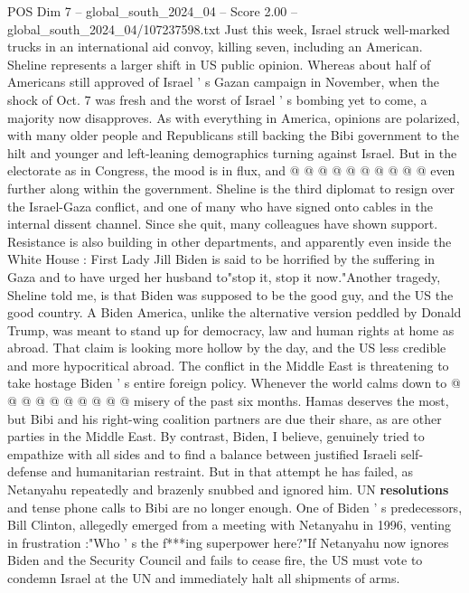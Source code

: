 \begin{textsample}{POS Dim 7 – global\_south\_2024\_04 – Score 2.00 – global\_south\_2024\_04/107237598.txt}
Just this week, Israel struck well-marked trucks in an international aid convoy, killing seven, including an American.
Sheline represents a larger shift in US public opinion.
Whereas about half of Americans still approved of Israel ' s Gazan campaign in November, when the shock of Oct. 7 was fresh and the worst of Israel ' s bombing yet to come, a majority now disapproves.
As with everything in America, opinions are polarized, with many older people and Republicans still backing the Bibi government to the hilt and younger and left-leaning demographics turning against Israel.
But in the electorate as in Congress, the mood is in flux, and @ @ @ @ @ @ @ @ @ @ even further along within the government.
Sheline is the third diplomat to resign over the Israel-Gaza conflict, and one of many who have signed onto cables in the internal dissent channel.
Since she quit, many colleagues have shown support.
Resistance is also building in other departments, and apparently even inside the White House : First Lady Jill Biden is said to be horrified by the suffering in Gaza and to have urged her husband to"stop it, stop it now."Another tragedy, Sheline told me, is that Biden was supposed to be the good guy, and the US the good country.
A Biden America, unlike the alternative version peddled by Donald Trump, was meant to stand up for democracy, law and human rights at home as abroad.
That claim is looking more hollow by the day, and the US less credible and more hypocritical abroad.
The conflict in the Middle East is threatening to take hostage Biden ' s entire foreign policy.
Whenever the world calms down to @ @ @ @ @ @ @ @ @ @ misery of the past six months.
Hamas deserves the most, but Bibi and his right-wing coalition partners are due their share, as are other parties in the Middle East.
By contrast, Biden, I believe, genuinely tried to empathize with all sides and to find a balance between justified Israeli self-defense and humanitarian restraint.
But in that attempt he has failed, as Netanyahu repeatedly and brazenly snubbed and ignored him.
UN \textbf{resolutions} and tense phone calls to Bibi are no longer enough.
One of Biden ' s predecessors, Bill Clinton, allegedly emerged from a meeting with Netanyahu in 1996, venting in frustration :"Who ' s the f***ing superpower here?"If Netanyahu now ignores Biden and the Security Council and fails to cease fire, the US must vote to condemn Israel at the UN and immediately halt all shipments of arms.

\end{textsample}
